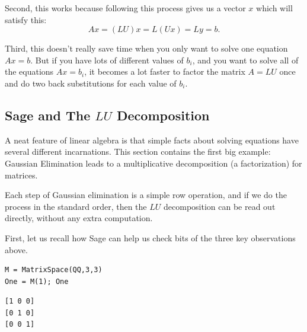 \documentclass[10pt,]{book}
\theoremstyle{plain}
\theoremstyle{definition}
\numberwithin{equation}{section}
\begin{document}
        Second, this works because following this process gives us a
        vector \(x\) which will satisfy this:
        \[
        Ax = (LU)x = L (Ux) = Ly = b.
        \]
\par

        Third, this doesn't really save time when you only want to solve
        one equation \(Ax= b\). But if you have lots of different values
        of \(b_i\), and you want to solve all of the equations \(Ax = b_i\),
        it becomes a lot faster to factor the matrix \(A= LU\) once and do
        two back substitutions for each value of \(b_i\).
\typeout{************************************************}
\typeout{************************************************}
\subsection[Sage and The \(LU\) Decomposition]{Sage and The \(LU\) Decomposition}\label{subsection-49}

      A neat feature of linear algebra is that simple facts about solving equations
      have several different incarnations. This section contains the first big
      example: Gaussian Elimination leads to a multiplicative decomposition (a
      factorization) for matrices.
\par

      Each step of Gaussian elimination is a simple row operation, and if we do
      the process in the standard order, then the \(LU\) decomposition can
      be read out directly, without any extra computation.
\par

      First, let us recall how Sage can help us check bits of
      the three key observations above.
\begin{lstlisting}[style=sageinput]
M = MatrixSpace(QQ,3,3)
One = M(1); One
\end{lstlisting}
\begin{lstlisting}[style=sageoutput]
[1 0 0]
[0 1 0]
[0 0 1]
\end{lstlisting}
\par
\end{document}
